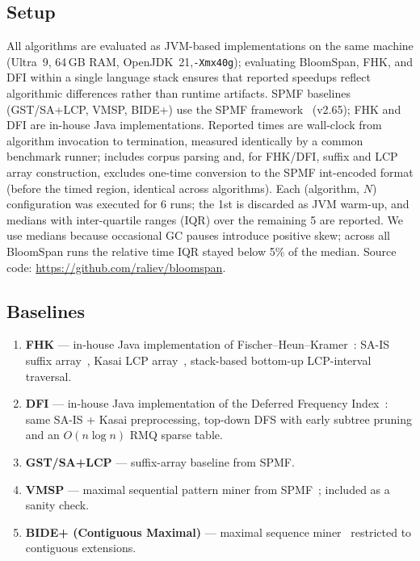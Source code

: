 \documentclass[runningheads]{llncs}
\begin{document}
    \subsection{Setup}
    All algorithms are evaluated as JVM-based implementations on the same machine (Ultra~9, 64\,GB RAM, OpenJDK~21,\texttt{-Xmx40g}); evaluating BloomSpan, FHK, and DFI within a single language stack ensures that reported speedups reflect algorithmic differences rather than runtime artifacts. SPMF baselines (GST/SA+LCP, VMSP, BIDE+) use the SPMF framework~\cite{fournierviger2016spmf} (v2.65); FHK and DFI are in-house Java implementations. Reported times are wall-clock from algorithm invocation to termination, measured identically by a common benchmark runner; includes corpus parsing and, for FHK/DFI, suffix and LCP array construction, excludes one-time conversion to the SPMF int-encoded format (before the timed region, identical across algorithms). Each (algorithm, $N$) configuration was executed for 6 runs; the 1st is discarded as JVM warm-up, and medians with inter-quartile ranges (IQR) over the remaining 5 are reported. We use medians because occasional GC pauses introduce positive skew; across all BloomSpan runs the relative time IQR stayed below 5\% of the median. Source code: \url{https://github.com/raliev/bloomspan}.

    \subsection{Baselines}
    \begin{enumerate}
        \item \textbf{FHK} --- in-house Java implementation of Fischer--Heun--Kramer~\cite{fischer2005icdm,fischer2006fast}: SA-IS suffix array~\cite{nong2011saiis}, Kasai LCP array~\cite{kasai2001linear}, stack-based bottom-up LCP-interval traversal.
        \item \textbf{DFI} --- in-house Java implementation of the Deferred Frequency Index~\cite{weese2008dfi}: same SA-IS + Kasai preprocessing, top-down DFS with early subtree pruning and an $O(n \log n)$ RMQ sparse table.
        \item \textbf{GST/SA+LCP} --- suffix-array baseline from SPMF.
        \item \textbf{VMSP} --- maximal sequential pattern miner from SPMF~\cite{fournier2014vmsp}; included as a sanity check.
        \item \textbf{BIDE+ (Contiguous Maximal)} --- maximal sequence miner~\cite{wang2004bide} restricted to contiguous extensions.
    \end{enumerate}
\end{document}
